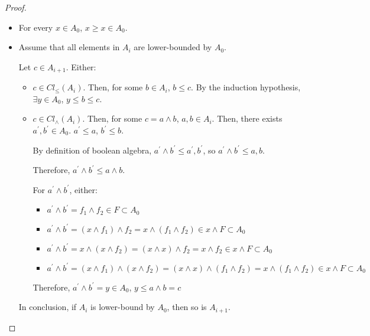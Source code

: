 \documentclass{article}
\begin{document}
\begin{enumerate}
\begin{enumerate}
\begin{proof}
\begin{description}
               \begin{itemize}
                 \item For every $x \in A_0$, $x ≥ x \in A_0$. 
                 \item Assume that all elements in $A_i$ are lower-bounded
                   by $A_0$.

                   Let $c \in A_{i+1}$. Either:
                   
                   \begin{itemize}
                     \item $c \in Cl_{≤}(A_i)$. Then, for some $b \in A_i$,
                       $b ≤ c$. By the induction hypothesis, $\exists y \in A_0$,
                       $y ≤ b ≤ c$.

                     \item $c \in Cl_{∧}(A_i)$. Then, for some $c = a ∧ b$,
                       $a, b \in A_i$. Then, there exists $a^\prime, b^\prime \in A_0$.
                       $a^\prime ≤ a$, $b^\prime ≤ b$.

                       By definition of boolean algebra, $a^\prime ∧ b^\prime ≤ a^\prime, b^\prime$,
                       so $a^\prime ∧ b^\prime ≤ a, b$.

                       Therefore, $a^\prime ∧ b^\prime ≤ a ∧ b$.

                       For $a^\prime ∧ b^\prime$, either:

                       \begin{itemize}
                         \item $a^\prime ∧ b^\prime = f_1 ∧ f_2 ∈ F \subset A_0$
                         \item $a^\prime ∧ b^\prime = (x ∧ f_1) ∧ f_2 = x ∧ (f_1 ∧ f_2) ∈ x ∧ F \subset A_0$
                         \item $a^\prime ∧ b^\prime = x ∧ (x ∧ f_2) = (x ∧ x) ∧ f_2 = x ∧ f_2 ∈ x ∧ F \subset A_0$
                         \item $a^\prime ∧ b^\prime = (x ∧ f_1) ∧ (x ∧ f_2) = (x ∧ x) ∧ (f_1 ∧ f_2) = x ∧ (f_1 ∧ f_2) ∈ x ∧ F \subset A_0$
                       \end{itemize}

                       Therefore, $a^\prime ∧ b^\prime = y ∈ A_0$, $y ≤ a ∧ b = c$
                  \end{itemize}

                   In conclusion, if $A_{i}$ is lower-bound by $A_0$, then
                   so is $A_{i+1}$.
               \end{itemize}
           \end{description}


\end{proof}
\end{enumerate}
\end{enumerate}
\end{document}
